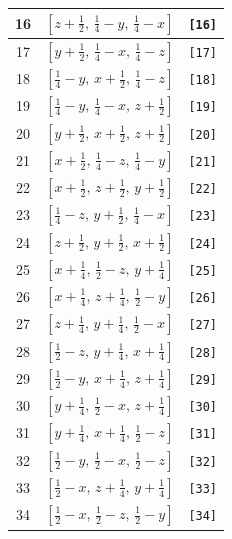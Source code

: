 \documentclass[fleqn,8pt]{jsarticle}
\begin{document}
\begin{longtable}{ccc}
16 & $\left[ z + \frac{1}{2},\, \frac{1}{4} - y,\, \frac{1}{4} - x \right]$ & {\tt [16]} \\ \hline
17 & $\left[ y + \frac{1}{2},\, \frac{1}{4} - x,\, \frac{1}{4} - z \right]$ & {\tt [17]} \\ \hline
18 & $\left[ \frac{1}{4} - y,\, x + \frac{1}{2},\, \frac{1}{4} - z \right]$ & {\tt [18]} \\ \hline
19 & $\left[ \frac{1}{4} - y,\, \frac{1}{4} - x,\, z + \frac{1}{2} \right]$ & {\tt [19]} \\ \hline
20 & $\left[ y + \frac{1}{2},\, x + \frac{1}{2},\, z + \frac{1}{2} \right]$ & {\tt [20]} \\ \hline
21 & $\left[ x + \frac{1}{2},\, \frac{1}{4} - z,\, \frac{1}{4} - y \right]$ & {\tt [21]} \\ \hline
22 & $\left[ x + \frac{1}{2},\, z + \frac{1}{2},\, y + \frac{1}{2} \right]$ & {\tt [22]} \\ \hline
23 & $\left[ \frac{1}{4} - z,\, y + \frac{1}{2},\, \frac{1}{4} - x \right]$ & {\tt [23]} \\ \hline
24 & $\left[ z + \frac{1}{2},\, y + \frac{1}{2},\, x + \frac{1}{2} \right]$ & {\tt [24]} \\ \hline
25 & $\left[ x + \frac{1}{4},\, \frac{1}{2} - z,\, y + \frac{1}{4} \right]$ & {\tt [25]} \\ \hline
26 & $\left[ x + \frac{1}{4},\, z + \frac{1}{4},\, \frac{1}{2} - y \right]$ & {\tt [26]} \\ \hline
27 & $\left[ z + \frac{1}{4},\, y + \frac{1}{4},\, \frac{1}{2} - x \right]$ & {\tt [27]} \\ \hline
28 & $\left[ \frac{1}{2} - z,\, y + \frac{1}{4},\, x + \frac{1}{4} \right]$ & {\tt [28]} \\ \hline
29 & $\left[ \frac{1}{2} - y,\, x + \frac{1}{4},\, z + \frac{1}{4} \right]$ & {\tt [29]} \\ \hline
30 & $\left[ y + \frac{1}{4},\, \frac{1}{2} - x,\, z + \frac{1}{4} \right]$ & {\tt [30]} \\ \hline
31 & $\left[ y + \frac{1}{4},\, x + \frac{1}{4},\, \frac{1}{2} - z \right]$ & {\tt [31]} \\ \hline
32 & $\left[ \frac{1}{2} - y,\, \frac{1}{2} - x,\, \frac{1}{2} - z \right]$ & {\tt [32]} \\ \hline
33 & $\left[ \frac{1}{2} - x,\, z + \frac{1}{4},\, y + \frac{1}{4} \right]$ & {\tt [33]} \\ \hline
34 & $\left[ \frac{1}{2} - x,\, \frac{1}{2} - z,\, \frac{1}{2} - y \right]$ & {\tt [34]} \\ \hline

\end{longtable}
\end{document}
